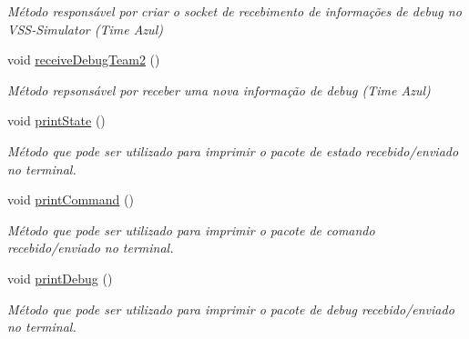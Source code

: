 \begin{DoxyCompactItemize}
\begin{DoxyCompactList}\small\item\em Método responsável por criar o socket de recebimento de informações de debug no V\+S\+S-\/\+Simulator (Time Azul) \end{DoxyCompactList}\item 
void \hyperlink{classInterface_a0e26d81e0b2ace89ac5b9f48481282c6}{receive\+Debug\+Team2} ()
\begin{DoxyCompactList}\small\item\em Método repsonsável por receber uma nova informação de debug (Time Azul) \end{DoxyCompactList}\item 
void \hyperlink{classInterface_ab8f9122465d78b9e41bfde9ea560a657}{print\+State} ()\hypertarget{classInterface_ab8f9122465d78b9e41bfde9ea560a657}{}\label{classInterface_ab8f9122465d78b9e41bfde9ea560a657}

\begin{DoxyCompactList}\small\item\em Método que pode ser utilizado para imprimir o pacote de estado recebido/enviado no terminal. \end{DoxyCompactList}\item 
void \hyperlink{classInterface_aaa4e713b2b72649d5253c83bf9e2416a}{print\+Command} ()\hypertarget{classInterface_aaa4e713b2b72649d5253c83bf9e2416a}{}\label{classInterface_aaa4e713b2b72649d5253c83bf9e2416a}

\begin{DoxyCompactList}\small\item\em Método que pode ser utilizado para imprimir o pacote de comando recebido/enviado no terminal. \end{DoxyCompactList}\item 
void \hyperlink{classInterface_ab7e5653bace447fe9836e8b26ae30247}{print\+Debug} ()\hypertarget{classInterface_ab7e5653bace447fe9836e8b26ae30247}{}\label{classInterface_ab7e5653bace447fe9836e8b26ae30247}

\begin{DoxyCompactList}\small\item\em Método que pode ser utilizado para imprimir o pacote de debug recebido/enviado no terminal. \end{DoxyCompactList}\end{DoxyCompactItemize}
